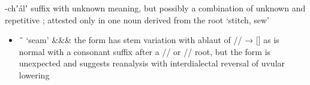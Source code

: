 \begin{morphdesc}[resume*=alphalist]
\item[-chʼálʼ]\label{m:-chʼálʼ}
	suffix with unknown meaning, but possibly a combination of unknown 
		and repetitive ;
	attested only in one noun derived from the root  ‘stitch, sew’
	\begin{itemize}
	\item	{} \~\  ‘seam’
			{&\·&\·&\·}
		\newline
		the form  has  stem variation
			with ablaut of // → [] as is normal with a consonant suffix
			after a // or // root,
		but the form  is unexpected and suggests reanalysis
			with interdialectal reversal of uvular lowering
	\end{itemize}


\end{morphdesc}

